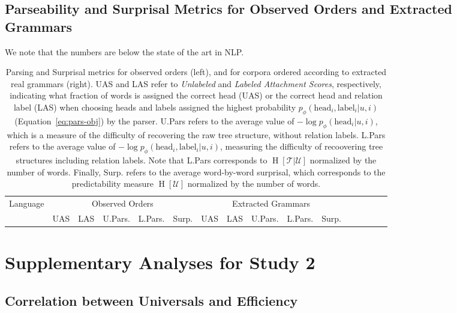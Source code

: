 \documentclass[10pt,twoside,lineno]{article}
\newcommand{\utterance}{\mathcal{U}}
\newcommand{\tree}{\mathcal{T}}
\begin{document}
\subsection{Parseability and Surprisal Metrics for Observed Orders and Extracted Grammars}

We note that the numbers are below the state of the art in NLP.


\begin{table}
\centering
\small{
\begin{tabular}{l||ll|ll|l||ll|ll|l|lllll}
	Language & \multicolumn{5}{c||}{Observed Orders} & \multicolumn{5}{c|}{Extracted Grammars} \\ 
	& UAS & LAS & U.Pars. & L.Pars. & Surp. & UAS & LAS & U.Pars. & L.Pars. & Surp.\\ \hline \hline

\end{tabular}
}
	\caption{Parsing and Surprisal metrics for observed orders (left), and for corpora ordered according to extracted real grammars (right). UAS and LAS refer to \emph{Unlabeled} and \emph{Labeled Attachment Scores}, respectively, indicating what fraction of words is assigned the correct head (UAS) or the correct head and relation label (LAS) when choosing heads and labels assigned the highest probability $p_\phi(\text{head}_i, \text{label}_i | u, i)$ (Equation~\ref{eq:pars-obj}) by the parser.
	U.Pars refers to the average value of $- \log p_\phi(\text{head}_i| u, i)$, which is a measure of the difficulty of recovering the raw tree structure, without relation labels. 
	L.Pars refers to the average value of $- \log p_\phi(\text{head}_i, \text{label}_i| u, i)$, measuring the difficulty of recoovering tree structures including relation labels.
	Note that L.Pars corresponds to $\operatorname{H}[\tree|\utterance]$ normalized by the number of words.
	Finally, Surp. refers to the average word-by-word surprisal, which corresponds to the predictability measure $\operatorname{H}[\utterance]$ normalized by the number of words.
	}\label{tab:observed-and-extracted}
\end{table}




\section{Supplementary Analyses for Study 2}
\subsection{Correlation between Universals and Efficiency}
\end{document}
